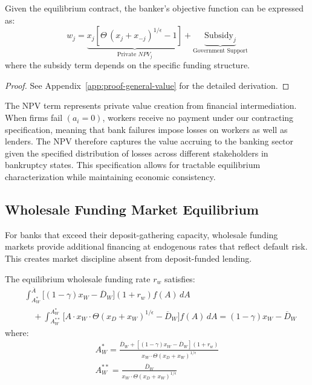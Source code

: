 \documentclass[12pt]{article}
\begin{document}
\begin{proposition}\label{prop:general-value}
Given the equilibrium contract, the banker's objective function can be expressed as:
\begin{equation}
    w_{j} = \underbrace{x_{j}[\Theta\,(x_{j}+x_{-j})^{1/\epsilon}-1]}_{\text{Private } NPV_{j}} + \underbrace{\text{Subsidy}_{j}}_{\text{Government Support}}
\end{equation}
where the subsidy term depends on the specific funding structure.
\end{proposition}

\begin{proof}
See Appendix~\ref{app:proof-general-value} for the detailed derivation.
\end{proof}

\begin{remark}
The NPV term represents private value creation from financial intermediation. When firms fail $(a_{i}=0)$, workers receive no payment under our contracting specification, meaning that bank failures impose losses on workers as well as lenders. The NPV therefore captures the value accruing to the banking sector given the specified distribution of losses across different stakeholders in bankruptcy states. This specification allows for tractable equilibrium characterization while maintaining economic consistency.
\end{remark}

\subsection{Wholesale Funding Market Equilibrium}
For banks that exceed their deposit-gathering capacity, wholesale funding markets provide additional financing at endogenous rates that reflect default risk. This creates market discipline absent from deposit-funded lending.

\begin{proposition}\label{prop:wholesale}
The equilibrium wholesale funding rate $r_{w}$ satisfies:
\begin{align}
    &\int_{A_{W}^{*}}^{\overline{A}} \big[(1-\gamma)x_{W}-\overline{D}_{W}\big](1+r_{w}) f(A)\,dA \nonumber \\
    &\quad + \int_{A_{W}^{**}}^{A_{W}^{*}} \big[A \cdot x_{W} \cdot \Theta(x_{D}+x_{W})^{1/\epsilon} - \overline{D}_{W}\big] f(A)\,dA = (1-\gamma)x_{W}-\overline{D}_{W}
\end{align}\label{eq:wholesale-breakeven}
where:
\begin{gather*}
    A_{W}^{*} = \frac{\overline{D}_{W} + [(1-\gamma)x_{W}-\overline{D}_{W}](1+r_{w})}{x_{W} \cdot \Theta(x_{D}+x_{W})^{1/\epsilon}} \\
    A_{W}^{**} = \frac{\overline{D}_{W}}{x_{W} \cdot \Theta(x_{D}+x_{W})^{1/\epsilon}}
\end{gather*}
\end{proposition}
\end{document}
